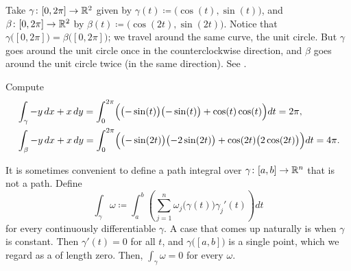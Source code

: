 \begin{example}
Take $\gamma \colon [0,2\pi] \to \R^2$ given by $\gamma(t) \coloneqq
\bigl(\cos(t),\sin(t)\bigr)$, and
$\beta \colon [0,2\pi] \to \R^2$ by $\beta(t) \coloneqq
\bigl(\cos(2t),\sin(2t)\bigr)$.  Notice that
$\gamma\bigl([0,2\pi]\bigr) = \beta\bigl([0,2\pi]\bigr)$; we travel
around the same curve, the unit circle.  But $\gamma$ goes around the unit
circle once in the counterclockwise direction, and $\beta$ goes around the
unit circle twice (in the same direction). 
See .
\begin{myfigureht}
\caption{Circular path traversed once by
$\gamma \colon [0,2\pi] \to \R^2$
and twice by
$\beta \colon [0,2\pi] \to \R^2$.\label{fig:circlepathrepar2}}
\end{myfigureht}

Compute
\begin{align*}
& \int_{\gamma} -y\, dx + x\,dy
=
\int_0^{2\pi}
\Bigl( \bigl(-\sin(t) \bigr) \bigl(-\sin(t) \bigr) + \cos(t) \cos(t) \Bigr) dt
=
2 \pi,\\
& \int_{\beta} -y\, dx + x\,dy
=
\int_0^{2\pi}
\Bigl( \bigl(-\sin(2t) \bigr) \bigl(-2\sin(2t) \bigr) + \cos(2t)
\bigl(2\cos(2t)\bigr) \Bigr) dt
=
4 \pi.
\end{align*}
\end{example}

It is sometimes convenient to define a path integral over $\gamma \colon
[a,b] \to {\mathbb{R}}^n$ that is not a path.
Define
\begin{equation*}
\int_{\gamma} \omega \coloneqq \int_a^b
\left(
\sum_{j=1}^n
\omega_j\bigl(\gamma(t)\bigr) \gamma_j'(t)
\right) dt 
\end{equation*}
for every continuously differentiable $\gamma$.  A 
case that comes up naturally is when $\gamma$ is constant.  Then
$\gamma'(t) = 0$ for all $t$, and $\gamma\bigl([a,b]\bigr)$ is a single
point, which we regard as a  of length zero.  Then,
$\int_{\gamma} \omega = 0$ for every $\omega$.

